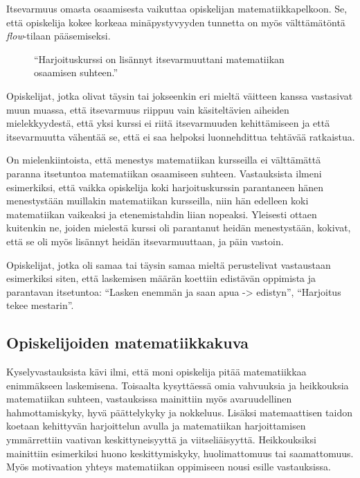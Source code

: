 Itsevarmuus omasta osaamisesta vaikuttaa opiskelijan matematiikkapelkoon.
Se, että opiskelija kokee korkeaa minäpystyvyyden tunnetta on myös välttämä\-töntä \emph{flow}-tilaan pääsemiseksi.

\begin{figure}[h!]
\centering
{}
\caption{``Harjoituskurssi on lisännyt itsevarmuuttani matematiikan osaamisen suhteen.''}
\end{figure}

Opiskelijat, jotka olivat täysin tai jokseenkin eri mieltä väitteen kanssa vastasivat muun muassa, että itsevarmuus riippuu vain käsiteltävien aiheiden mielekkyydestä, että yksi kurssi ei riitä itsevarmuuden kehittämiseen ja että itsevarmuutta vähentää se, että ei saa helpoksi luonnehdittua tehtävää ratkaistua. 

On mielenkiintoista, että menestys matematiikan kursseilla ei välttämättä paranna itsetuntoa matematiikan osaamiseen suhteen. Vastauksista ilmeni esimerkiksi, että vaikka opiskelija koki harjoituskurssin parantaneen hänen menestystään muillakin matematiikan kursseilla, niin hän edelleen koki matematiikan vaikeaksi ja etenemistahdin liian nopeaksi. Yleisesti ottaen kuitenkin ne, joiden mielestä kurssi oli parantanut heidän menestystään, kokivat, että se oli myös lisännyt heidän itsevarmuuttaan, ja päin vastoin.

Opiskelijat, jotka oli samaa tai täysin samaa mieltä perustelivat vastaustaan esimerkiksi siten, että laskemisen määrän koettiin edistävän oppimista ja parantavan itsetuntoa: ``Lasken enemmän ja saan apua -> edistyn'', ``Harjoitus tekee mestarin''. 



\subsection{Opiskelijoiden matematiikkakuva}
Kyselyvastauksista kävi ilmi, että moni opiskelija pitää matematiikkaa enim\-mäk\-seen laskemisena. Toisaalta kysyttäessä omia vahvuuksia ja heikkouksia matematiikan suhteen, vastauksissa mainittiin myös avaruudellinen hahmottamiskyky, hyvä päättelykyky ja nokkeluus.
Lisäksi matemaattisen taidon koetaan kehittyvän harjoittelun avulla ja matematiikan harjoittamisen ymmärrettiin vaativan keskittyneisyyttä ja viitseliäisyyttä. Heikkouksiksi mainittiin esimerkiksi huono keskittymiskyky, huolimattomuus tai saamattomuus. Myös motivaation yhteys matematiikan oppimiseen nousi esille vastauksissa.

